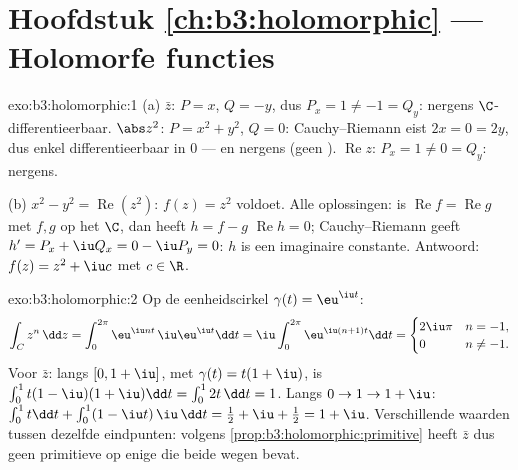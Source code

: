 \section*{Hoofdstuk \ref{ch:b3:holomorphic} --- Holomorfe
functies}

\begin{solution}{exo:b3:holomorphic:1}
(a) $\bar z$: $P = x$, $Q = -y$, dus $P_x = 1 \neq -1 = Q_y$:
nergens $\C$-differentieerbaar. $\abs z^2$: $P = x^2 + y^2$, $Q =
0$: Cauchy--Riemann eist $2x = 0 = 2y$, dus enkel
differentieerbaar in $0$ --- en nergens  (geen ). $\operatorname{Re}z$: $P_x = 1 \neq 0 = Q_y$:
nergens.

(b) $x^2 - y^2 = \operatorname{Re}(z^2)$: $f(z) = z^2$ voldoet.
Alle oplossingen: is $\operatorname{Re}f = \operatorname{Re}g$
met $f, g$  op het  $\C$, dan heeft $h = f -
g$ $\operatorname{Re}h = 0$; Cauchy--Riemann geeft $h' = P_x +
\iu Q_x = 0 - \iu P_y = 0$: $h$ is een imaginaire constante.
Antwoord: $f(z) = z^2 + \iu c$ met $c \in \R$.
\end{solution}

\begin{solution}{exo:b3:holomorphic:2}
Op de eenheidscirkel $\gamma(t) = \eu^{\iu t}$:
\[
\int_C z^n\,\dd z = \int_0^{2\pi}\eu^{\iu nt}\,\iu\eu^{\iu
t}\dd t = \iu\int_0^{2\pi}\eu^{\iu(n+1)t}\dd t
= \begin{cases} 2\iu\pi & n = -1,\\ 0 & n \neq -1.\end{cases}
\]
Voor $\bar z$: langs $[0, 1+\iu]$, met $\gamma(t) = t(1 + \iu)$,
is $\int_0^1 t(1 - \iu)(1 + \iu)\dd t = \int_0^12t\,\dd t = 1$.
Langs $0 \to 1 \to 1 + \iu$: $\int_0^1t\dd t + \int_0^1(1 - \iu
t)\,\iu\,\dd t = \frac12 + \iu + \frac12 = 1 + \iu$.
Verschillende waarden tussen dezelfde eindpunten: volgens
\cref{prop:b3:holomorphic:primitive} heeft $\bar z$ dus geen
primitieve op enige  die beide wegen bevat.
\end{solution}

